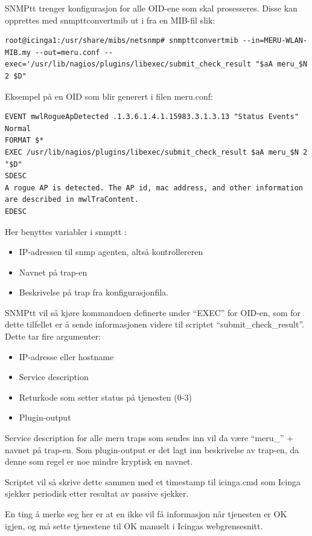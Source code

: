 SNMPtt trenger konfigurasjon for alle OID-ene som skal prosesseres. Disse kan opprettes med snmpttconvertmib ut i fra en MIB-fil slik:

\begin{lstlisting}
root@icinga1:/usr/share/mibs/netsnmp# snmpttconvertmib --in=MERU-WLAN-MIB.my --out=meru.conf --exec='/usr/lib/nagios/plugins/libexec/submit_check_result "$aA meru_$N 2 $D"
\end{lstlisting}

Eksempel på en OID som blir generert i filen meru.conf:

\begin{lstlisting}
EVENT mwlRogueApDetected .1.3.6.1.4.1.15983.3.1.3.13 "Status Events" Normal
FORMAT $*
EXEC /usr/lib/nagios/plugins/libexec/submit_check_result $aA meru_$N 2 "$D"
SDESC
A rogue AP is detected. The AP id, mac address, and other information are described in mwlTraContent.
EDESC
\end{lstlisting}

Her benyttes variabler i snmptt \cite{snmptrans}:
\begin{itemize}
	\item IP-adressen til snmp agenten, altså kontrollereren
	\item Navnet på trap-en
	\item Beskrivelse på trap fra konfigurasjonfila.
\end{itemize}

SNMPtt vil så kjøre kommandoen definerte under “EXEC” for OID-en, som for dette tilfellet er å sende informasjonen videre til scriptet “submit\_check\_result”. Dette tar fire argumenter:

\begin{itemize}
	\item IP-adresse eller hostname 
	\item Service description
	\item Returkode som setter status på tjenesten (0-3)
	\item Plugin-output
\end{itemize}

Service description for alle meru traps som sendes inn vil da være “meru\_” + navnet på trap-en. Som plugin-output er det lagt inn beskrivelse av trap-en, da denne som regel er noe mindre kryptisk en navnet.

Scriptet vil så skrive dette sammen med et timestamp til icinga.cmd som Icinga sjekker periodisk etter resultat av passive sjekker.

En ting å merke seg her er at en ikke vil få informasjon når tjenesten er OK igjen, og må sette tjenestene til OK manuelt i Icingas webgrensesnitt.

